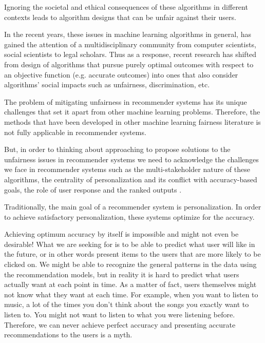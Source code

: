 Ignoring the societal and ethical consequences of these algorithms in different contexts leads to algorithm designs that can be unfair against their users.

In the recent years, these issues in machine learning algorithms in general, has gained the attention of a multidisciplinary community from computer scientists, social scientists to legal scholars. Thus as a response, recent research has shifted from design of algorithms that pursue purely optimal outcomes with respect to an objective function (e.g. accurate outcomes) into ones that also consider algorithms' social impacts such as unfairness, discrimination, etc.

The problem of mitigating unfairness in recommender systems has its unique challenges that set it apart from other machine learning problems. Therefore, the methods that have been developed in other machine learning fairness literature is not fully applicable in recommender systems.

But, in order to thinking about approaching to propose solutions to the unfairness issues in recommender systems we need to acknowledge the challenges we face in recommender systems such as the multi-stakeholder nature of these algorithms, the centrality of personalization and its conflict with accuracy-based goals, the role of user response  and the ranked outputs .

Traditionally, the main goal of a recommender system is personalization. In order to achieve satisfactory personalization, these systems optimize for the accuracy.


Achieving optimum accuracy by itself is impossible and might not even be desirable! What we are seeking for is to be able to predict what user will like in the future, or in other words present items to the users that are more likely to be clicked on. We might be able to recognize the general patterns in the data using the recommendation models, but in reality it is hard to predict what users actually want at each point in time. As a matter of fact, users themselves might not know what they want at each time. For example, when you want to listen to music, a lot of the times you don't think about the songs you exactly want to listen to. You might not want to listen to what you were listening before. Therefore, we can never achieve perfect accuracy and presenting accurate recommendations to the users is a myth.

